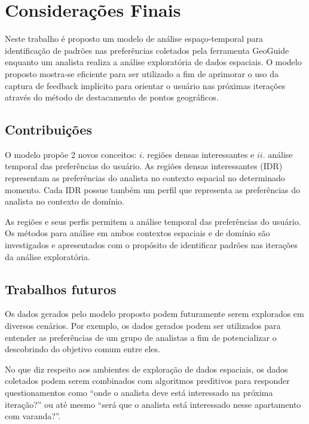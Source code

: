 \chapter{Considerações Finais}
\label{chap:conclusao}

Neste trabalho é proposto um modelo de análise espaço-temporal para identificação de padrões nas preferências coletados pela ferramenta GeoGuide enquanto um analista realiza a análise exploratória de dados espaciais. O modelo proposto mostra-se eficiente para ser utilizado a fim de aprimorar o uso da captura de feedback implícito para orientar o usuário nas próximas iterações através do método de destacamento de pontos geográficos.

\section{Contribuições}

O modelo propõe 2 novos conceitos: $i$. regiões densas interessantes e $ii$. análise temporal das preferências do usuário. As regiões densas interessantes (IDR) representam as preferências do analista no contexto espacial no determinado momento. Cada IDR possue também um perfil que representa as preferências do analista no contexto de domínio.

As regiões e seus perfis permitem a análise temporal das preferências do usuário. Os métodos para análise em ambos contextos espaciais e de domínio são investigados e apresentados com o propósito de identificar padrões nas iterações da análise exploratória.

\section{Trabalhos futuros}

Os dados gerados pelo modelo proposto podem futuramente serem explorados em diversos cenários. Por exemplo, os dados gerados podem ser utilizados para entender as preferências de um grupo de analistas a fim de potencializar o descobrindo do objetivo comum entre eles.

No que diz respeito aos ambientes de exploração de dados espaciais, os dados coletados podem serem combinados com algoritmos preditivos para responder questionamentos como ``onde o analista deve está interessado na próxima iteração?'' ou até mesmo ``será que o analista está interessado nesse apartamento com varanda?''.  
